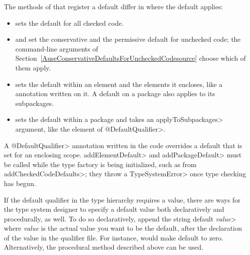 \begin{sloppypar}
The methods of  that
register a default differ in where the default applies:
\begin{itemize}
\item
  sets the default for all checked code.
\item
  and
  set the conservative and the permissive default for unchecked code; the
  command-line arguments of Section~\ref{AuseConservativeDefaultsForUncheckedCodesource}
  choose which of them apply.
\item
  sets the default within an element and the elements it encloses, like a
   annotation written on it.
  A default on a package also applies to its subpackages.
\item
  sets the default within a package and takes an \<applyToSubpackages>
  argument, like the element of \<@DefaultQualifier>.
\end{itemize}
A \<@DefaultQualifier> annotation written in the code overrides a default
that is set for an enclosing scope.
\<addElementDefault> and \<addPackageDefault> must be called while the type
factory is being initialized, such as from \<addCheckedCodeDefaults>; they
throw a \<TypeSystemError> once type checking has begun.
\end{sloppypar}

If the default qualifier in the type hierarchy requires a value, there are
ways for the type system designer to specify a default value both
declaratively and procedurally, as well.  To do so declaratively, append
the string \<default \emph{value}> where \emph{value} is the actual value
you want to be the default, after the declaration of the value in the
qualifier file.  For instance,  would make
 default to zero. Alternatively, the procedural method
described above can be used.

